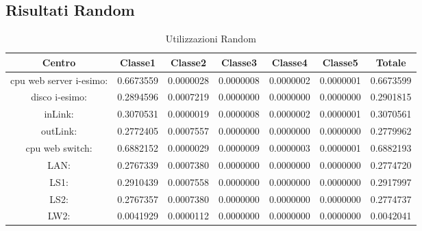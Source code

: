 \subsection{Risultati Random}
\begin{table}[H]
\begin{center}\begin{scriptsize}
\begin{tabular}{||c|c|c|c|c|c|c||}
\hline
Centro &Classe1 &Classe2 &Classe3 &Classe4 &Classe5 &Totale\\
\hline
\hline
 cpu web server i-esimo: 	&0.6673559	&0.0000028	&0.0000008	&0.0000002	&0.0000001	&0.6673599\\
\hline
 disco i-esimo: 	&0.2894596	&0.0007219	&0.0000000	&0.0000000	&0.0000000	&0.2901815\\
\hline
 inLink: 	&0.3070531	&0.0000019	&0.0000008	&0.0000002	&0.0000001	&0.3070561\\
\hline
 outLink: 	&0.2772405	&0.0007557	&0.0000000	&0.0000000	&0.0000000	&0.2779962\\
\hline
 cpu web switch: 	&0.6882152	&0.0000029	&0.0000009	&0.0000003	&0.0000001	&0.6882193\\
\hline
 LAN: 	&0.2767339	&0.0007380	&0.0000000	&0.0000000	&0.0000000	&0.2774720\\
\hline
 LS1: 	&0.2910439	&0.0007558	&0.0000000	&0.0000000	&0.0000000	&0.2917997\\
\hline
 LS2:	&0.2767357	&0.0007380	&0.0000000	&0.0000000	&0.0000000	&0.2774737\\
\hline
 LW2: 	&0.0041929	&0.0000112	&0.0000000	&0.0000000	&0.0000000	&0.0042041\\
\hline
\end{tabular}
\end{scriptsize}\end{center}
\caption{Utilizzazioni Random}
\label{risrandom}
\end{table}

